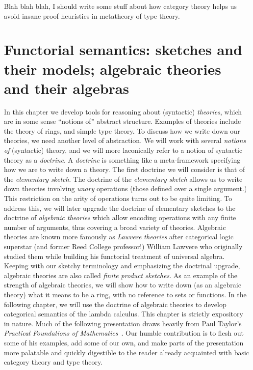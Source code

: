\documentclass[12pt,twoside]{reedthesis}
\theoremstyle{definition}
\theoremstyle{remark}
\theoremstyle{plain}
\begin{document}
Blah blah blah, I should write some stuff about how category theory helps us
avoid insane proof heuristics in metatheory of type theory.

\chapter{Functorial semantics: sketches and their models; algebraic theories and their algebras}
In this chapter we develop tools for reasoning about (syntactic)
\emph{theories}, which are in some sense ``notions of'' abstract structure.
Examples of theories include the theory of rings, and simple type theory. To
discuss how we write down our theories, we need another level of abstraction. We
will work with several \emph{notions of} (syntactic) theory, and we will more
laconically refer to a notion of syntactic theory as a \emph{doctrine}. A
\emph{doctrine} is something like a meta-framework specifying how we are to
write down a theory. The first doctrine we will consider is that of the
\emph{elementary sketch}. %
The doctrine of the \emph{elementary sketch} allows us to write down theories
involving \emph{unary} operations (those defined over a single argument.) This
restriction on the arity of operations turns out to be quite limiting. To
address this, we will later upgrade the doctrine of elementary sketches to the
doctrine of \emph{algebraic theories} which allow encoding operations with any
finite number of arguments, thus covering a broad variety of theories. Algebraic
theories are known more famously as \emph{Lawvere theories} after categorical
logic superstar (and former Reed College professor!) William Lawvere who
originally studied them while building his functorial treatment of universal
algebra. Keeping with our sketchy terminology and emphasizing the doctrinal
upgrade, algebraic theories are also called \emph{finite product sketches}. As
an example of the strength of algebraic theories, we will show how to write down
(as an algebraic theory) what it means to be a ring, with no reference to sets
or functions. In the following chapter, we will use the doctrine of algebraic
theories to develop categorical semantics of the lambda calculus. This chapter
is strictly expository in nature. Much of the following presentation draws
heavily from Paul Taylor's \emph{Practical Foundations of
  Mathematics}~\cite{taylor_practical_1999}. Our humble contribution is to flesh
out some of his examples, add some of our own, and make parts of the
presentation more palatable and quickly digestible to the reader already
acquainted with basic category theory and type theory.
\end{document}
